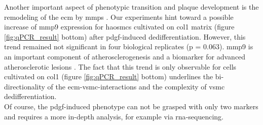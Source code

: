 Another important aspect of phenotypic transition and plaque development is the remodeling of the \ac{ecm} by \acp{mmp} \cite{johnsonMetalloproteinasesAtherosclerosis2017}.
Our experiments hint toward a possible increase of \ac{mmp9} expression for \acp{haosmc} cultivated on \ac{col1} matrix (figure \ref{fig:qPCR_result} bottom) after \ac{pdgf}-induced dedifferentiation. However, this trend remained not significant in four biological replicates (p = 0.063). \ac{mmp9} is an important component of atherosclerogenesis \cite{galisIncreasedExpressionMatrix1994} and a biomarker for advanced atherosclerotic lesions \cite{langleyExtracellularMatrixProteomics2017}. The fact that this trend is only observable for cells cultivated on \ac{col1} (figure \ref{fig:qPCR_result} bottom) underlines the bi-directionality of the \ac{ecm}-\ac{vsmc}-interactions and the complexity of \ac{vsmc} dedifferentiation.\\
Of course, the \ac{pdgf}-induced phenotype can not be grasped with only two markers and requires a more in-depth analysis, for example via \ac{rna}-sequencing.


